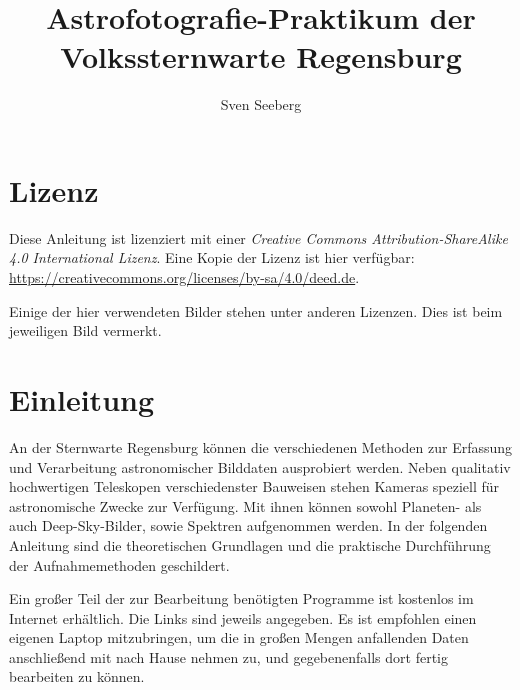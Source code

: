 \documentclass[10pt,a4paper,titlepage]{article}
\begin{document}
\begin{titlepage}
\author[1]{Sven Seeberg}
\title{Astrofotografie-Praktikum der Volkssternwarte Regensburg}
\end{titlepage}
\maketitle

\tableofcontents
\section{Lizenz}
Diese Anleitung ist lizenziert mit einer \textit{Creative Commons Attribution-ShareAlike 4.0 International Lizenz}. Eine Kopie der Lizenz ist hier verfügbar: \url{https://creativecommons.org/licenses/by-sa/4.0/deed.de}.

Einige der hier verwendeten Bilder stehen unter anderen Lizenzen. Dies ist beim jeweiligen Bild vermerkt.


\section{Einleitung}
An der Sternwarte Regensburg können die verschiedenen Methoden zur Erfassung und Verarbeitung astronomischer Bilddaten ausprobiert werden. Neben qualitativ hochwertigen Teleskopen verschiedenster Bauweisen stehen Kameras speziell für astronomische Zwecke zur Verfügung. Mit ihnen können sowohl Planeten- als auch Deep-Sky-Bilder, sowie Spektren aufgenommen werden. In der folgenden Anleitung sind die theoretischen Grundlagen und die praktische Durchführung der Aufnahmemethoden geschildert.

Ein großer Teil der zur Bearbeitung benötigten Programme ist kostenlos im Internet erhältlich. Die Links sind jeweils angegeben. Es ist empfohlen einen eigenen Laptop mitzubringen, um die in großen Mengen anfallenden Daten anschließend mit nach Hause nehmen zu, und gegebenenfalls dort fertig bearbeiten zu können.
\end{document}
